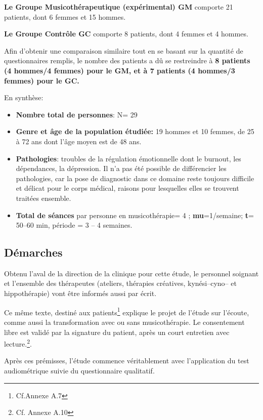 \textbf{Le Groupe Musicothérapeutique (expérimental) GM} comporte 21
patients, dont 6
femmes et 15 hommes.

\textbf{Le  Groupe Contrôle GC} comporte 8 patients, dont 4 femmes et 4 hommes.

Afin d'obtenir une comparaison similaire tout en se basant sur la quantité de questionnaires remplis, le nombre
des patients a dû se restreindre à \textbf{8
patients (4 hommes/4 femmes) pour le GM, et à 7 patients (4 hommes/3
femmes) pour le GC.}



En synthèse:
 \begin{itemize}

 \item \textbf{Nombre total de personnes}: N= 29
\item\textbf{Genre et âge de la population étudiée:}  19 hommes et 10 femmes, de 25 à 72
  ans dont l'âge moyen est de 48 ans.
 \item\textbf{Pathologies}: troubles de la régulation émotionnelle
   dont le burnout, les dépendances, la dépression.
   Il n'a pas été
   possible de différencier les pathologies, car la pose de
   diagnostic dans ce domaine reste toujours difficile et délicat pour le corps médical, raisons pour lesquelles elles
   se trouvent traitées ensemble.
 \item \textbf{Total de séances} par personne en
   musicothérapie= 4 ;   \textbf{mu}=1/semaine;
 \textbf{t}= 50--60 min, période = 3 -- 4 semaines.
\end{itemize}




\subsection{Démarches}
Obtenu l'aval de la direction de la
clinique pour cette étude,  le personnel soignant et l'ensemble des
thérapeutes (ateliers, thérapies créatives, kynési--cyno--
et hippothérapie) vont être informés aussi par écrit.

Ce même texte, destiné aux
patients\footnote{Cf.Annexe A.7} explique le projet de l'étude sur l'écoute, comme aussi la transformation
avec ou sans musicothérapie.
Le consentement libre est validé par la signature du patient, après
un court entretien avec lecture.\footnote{Cf. Annexe A.10}.


Après ces prémisses, l'étude commence véritablement avec l'application du test
audiométrique suivie du questionnaire qualitatif.

